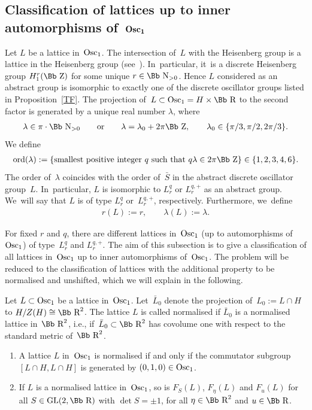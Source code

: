 \documentclass[10pt,a4paper]{amsart}
\newcommand\RR{{\mbox{\Bb R}}}
\newcommand\NN{{\mbox{\Bb N}}}
\newcommand\ZZ{{\mbox{\Bb Z}}}
\newcommand{\GL}{\mathop{{\rm GL}}}
\newcommand{\Osc}{{\rm Osc}}
\newcommand{\ord}{{\rm ord}}
\newcommand{\benur}{\begin{enumerate}[label=$(\roman*)$]\itemsep=0pt}
\numberwithin{equation}{section}
\begin{document}
\subsection[Classification of lattices up to inner automorphisms of~$\Osc_1$]
{Classification of lattices up to inner automorphisms of~$\boldsymbol{\Osc_1}$}
\label{S42}
Let $L$ be a lattice in~$\Osc_1$. The intersection of~$L$ with the Heisenberg group is a lattice in the Heisenberg group (see~\cite[Corollary~3.5]{Ra72}). In~particular, it~is a discrete Heisenberg group $H_1^r(\ZZ)$ for some unique $r\in\NN_{>0}$. Hence $L$ considered as an abstract group is isomorphic to exactly one of the discrete oscillator groups listed in Proposition~\ref{TF}.
The projection of~$L\subset\Osc_1=H\times\RR$ to the second factor is generated by a unique real number $\lambda$, where
\begin{gather*}
\lambda\in \pi\cdot \NN_{>0}\qquad \text{or}\qquad \lambda= \lambda_0+2\pi\ZZ,\qquad \lambda_0\in \{\pi/3, \pi/2, 2\pi/3\}.
\end{gather*}
We define
\begin{gather*}
\ord(\lambda):=\{\text{smallest positive integer $q$ such that } q\lambda\in 2\pi\ZZ\}
\in\{1,2,3,4,6\}.
\end{gather*}
The order of~$\lambda$ coincides with the order of~$\bar S$ in the abstract discrete oscillator group~$L$. In~particular, $L$ is isomorphic to $L^q_r$ or $L^{q,+}_r$ as an abstract group. We~will say that $L$ is of type $L^q_r$ or~$L^{q,+}_r$, respectively. Furthermore, we~define
\begin{gather}\label{Drlambda}
r(L):=r,\qquad\lambda(L):=\lambda.
\end{gather}

For fixed $r$ and $q$, there are different lattices in~$\Osc_1$ (up to automorphisms of~$\Osc_1$) of type~$L^q_r$ and $L^{q,+}_r$. The aim of this subsection is to give a classification of all lattices in~$\Osc_1$ up to inner automorphisms of~$\Osc_1$. The problem will be reduced to the classification of lattices with the additional property to be normalised and unshifted, which we will explain in the following.
%
\begin{Definition} Let $L\subset \Osc_1$ be a lattice in~$\Osc_1$. Let~$\bar L_0$ denote the projection of~$L_0:=L\cap H$ to $H/Z(H)\cong \RR^2$. The lattice $L$ is called normalised if $\bar L_0$ is a normalised lattice in~$\RR^2$, i.e., if~$\bar L_0\subset \RR^2$ has covolume one with respect to the standard metric of~$\RR^2$.
\end{Definition}
\begin{Remark}\quad
\benur
\item A lattice $L$ in~$\Osc_1$ is normalised if and only if the commutator subgroup $[L\cap H,L\cap H]$ is generated by $(0,1,0)\in\Osc_1$.
\item
If $L$ is a normalised lattice in~$\Osc_1$, so is $F_S(L)$, $F_\eta(L)$ and $F_u(L)$ for all $S\in\GL(2,\RR)$ with $\det S=\pm 1$, for all $\eta\in \RR^2$ and $u\in\RR$.
\end{enumerate}
\end{Remark}
\end{document}
